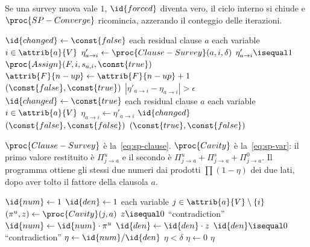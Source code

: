 Se una survey nuova vale $1$, $\id{forced}$ diventa vero, il ciclo interno si chiude e $\proc{SP-Converge}$ ricomincia, azzerando il conteggio delle iterazioni.

\begin{codebox}
\li $\id{changed} \gets \const{false}$
\li \For each residual clause $a$
\li     \Do
            \For each variable $i \in \attrib{a}{V}$
\li             \Do
                    $\eta'_{a \to i} \gets \proc{Clause-Survey}(a, i, \delta)$
\li                 \If $\eta'_{a \to i} \isequal 1$
\li                     \Then
                            $\proc{Assign}(F, i, s_{a,i}, \const{true})$
\li                         $\attrib{F}{n-up} \gets \attrib{F}{n-up}+1$
\li                         \Return $(\const{false}, \const{true})$
                        \End
\li                 \If $|\eta'_{a \to i} - \eta_{a \to i}| > \epsilon$
\li                     \Then $\id{changed} \gets \const{true}$
                        \End
                \End
        \End
\li \For each residual clause $a$
\li     \Do
            \For each variable $i \in \attrib{a}{V}$
\li             \Do $\eta_{a \to i} \gets \eta'_{a \to i}$
                \End
        \End
\li \If $\id{changed}$
\li     \Then \Return $(\const{false}, \const{false})$
\li     \Else \Return $(\const{true}, \const{false})$
        \End
\end{codebox}

$\proc{Clause-Survey}$ è la~\eqref{eq:sp-clause}.
$\proc{Cavity}$ è la~\eqref{eq:sp-var}: il primo valore restituito è $\Pi^u_{j\to a}$ e il secondo è $\Pi^u_{j\to a}+\Pi^s_{j\to a}+\Pi^0_{j\to a}$.
Il programma ottiene gli stessi due numeri dai prodotti $\prod(1-\eta)$ dei due lati, dopo aver tolto il fattore della clausola $a$.

\begin{codebox}
\li $\id{num} \gets 1$
\li $\id{den} \gets 1$
\li \For each variable $j \in \attrib{a}{V} \setminus \{i\}$
\li     \Do
            $(\pi^u, z) \gets \proc{Cavity}(j, a)$
\li         \If $z \isequal 0$
\li             \Then \Error ``contradiction''
                \End
\li         $\id{num} \gets \id{num} \cdot \pi^u$
\li         $\id{den} \gets \id{den} \cdot z$
        \End
\li \If $\id{den} \isequal 0$
\li     \Then \Error ``contradiction''
        \End
\li $\eta \gets \id{num} / \id{den}$
\li \If $\eta < \delta$
\li     \Then $\eta \gets 0$
        \End
\li \Return $\eta$
\end{codebox}

